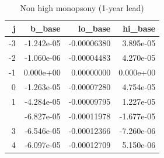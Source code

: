 \begin{table}

\caption{Non high monopsony (1-year lead)}
\centering
\begin{tabular}[t]{rrrr}
\toprule
j & b\_base & lo\_base & hi\_base\\
\midrule
-3 & -1.242e-05 & -0.00006380 & 3.895e-05\\
-2 & -1.060e-06 & -0.00004483 & 4.270e-05\\
-1 & 0.000e+00 & 0.00000000 & 0.000e+00\\
0 & -1.263e-05 & -0.00007280 & 4.754e-05\\
1 & -4.284e-05 & -0.00009795 & 1.227e-05\\
\addlinespace
2 & -6.827e-05 & -0.00011978 & -1.677e-05\\
3 & -6.546e-05 & -0.00012366 & -7.260e-06\\
4 & -6.097e-05 & -0.00012709 & 5.150e-06\\
\bottomrule
\end{tabular}
\end{table}
